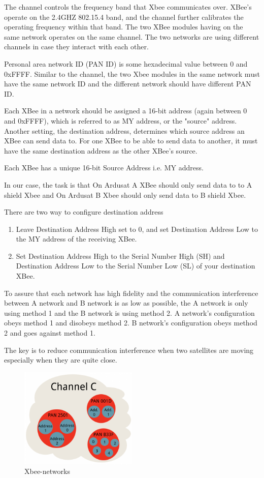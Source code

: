 The channel controls the frequency band that Xbee communicates over. XBee's operate on the 2.4GHZ 802.15.4 band, and the channel further calibrates the operating frequency within that band. The two XBee modules having on the same network operates on the same channel. The two networks are using different channels in case they interact with each other.

Personal area network ID (PAN ID) is some hexadecimal value between 0 and 0xFFFF. Similar to the channel, the two Xbee modules in the same network must have the same network ID and the different network should have different PAN ID.

 Each XBee in a network should be assigned a 16-bit address (again between 0 and 0xFFFF), which is referred to as MY address, or the "source" address. Another setting, the destination address, determines which source address an XBee can send data to. For one XBee to be able to send data to another, it must have the same destination address as the other XBee's source.

Each XBee has a unique 16-bit Source Address i.e. MY address.

In our case, the task is that On Ardusat A XBee should only send data to to A shield Xbee and On Ardusat B Xbee should only send data to B shield Xbee.

There are two way to configure destination address
\begin{enumerate}
\item Leave Destination Address High set to 0, and set Destination Address Low to the MY address of the receiving XBee.

\item Set Destination Address High to the Serial Number High (SH) and Destination Address Low to the Serial Number Low (SL) of your destination XBee.
\end{enumerate}
To assure that each network has high fidelity and the communication interference between A network and B network is as low as possible, the A network is only using method 1 and the B network is using method 2. A network's configuration obeys method 1 and disobeys method 2. B network's configuration obeys method 2 and goes against method 1.

The key is to reduce communication interference when two satellites are moving especially when they are quite close.

\begin{figure}[ht]
\centering
\includegraphics[width = 0.5\textwidth]{fig/DOE/Network}
\caption{Xbee-networks}
\end{figure}

